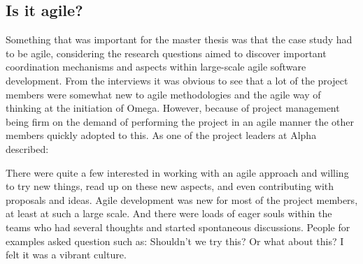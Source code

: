 \subsection{Is it agile?}

Something that was important for the master thesis was that the case study had to be agile, considering the research questions aimed to discover important coordination mechanisms and aspects within large-scale agile software development. From the interviews it was obvious to see that a lot of the project members were somewhat new to agile methodologies and the agile way of thinking at the initiation of Omega. However, because of project management being firm on the demand of performing the project in an agile manner the other members quickly adopted to this. As one of the project leaders at Alpha described:

\begin{fancyquotes}
There were quite a few interested in working with an agile approach and willing to try new things, read up on these new aspects, and even contributing with proposals and ideas. Agile development was new for most of the project members, at least at such a large scale. And there were loads of eager souls within the teams who had several thoughts and started spontaneous discussions. People for examples asked question such as: Shouldn't we try this? Or what about this? I felt it was a vibrant culture.
\end{fancyquotes}